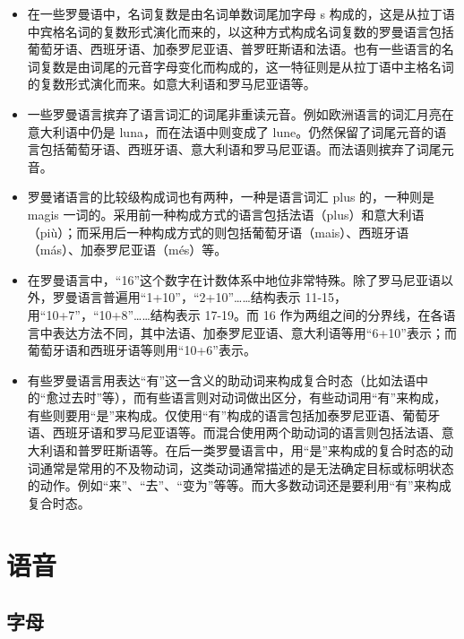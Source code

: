 \documentclass[UTF8,a4paper,titlepage,10pt]{report}
\begin{document}
\begin{enumerate}
\begin{itemize}
\item 在一些罗曼语中，名词复数是由名词单数词尾加字母 s 构成的，这是从拉丁语中宾格名词的复数形式演化而来的，以这种方式构成名词复数的罗曼语言包括葡萄牙语、西班牙语、加泰罗尼亚语、普罗旺斯语和法语。也有一些语言的名词复数是由词尾的元音字母变化而构成的，这一特征则是从拉丁语中主格名词的复数形式演化而来。如意大利语和罗马尼亚语等。
\item 一些罗曼语言摈弃了语言词汇的词尾非重读元音。例如欧洲语言的词汇月亮在意大利语中仍是 luna，而在法语中则变成了 lune。仍然保留了词尾元音的语言包括葡萄牙语、西班牙语、意大利语和罗马尼亚语。而法语则摈弃了词尾元音。
\item 罗曼诸语言的比较级构成词也有两种，一种是语言词汇 plus 的，一种则是 magis 一词的。采用前一种构成方式的语言包括法语（plus）和意大利语（più）；而采用后一种构成方式的则包括葡萄牙语（mais）、西班牙语（más）、加泰罗尼亚语（més）等。
\item 在罗曼语言中，“16”这个数字在计数体系中地位非常特殊。除了罗马尼亚语以外，罗曼语言普遍用“1+10”，“2+10”……结构表示 11-15，用“10+7”，“10+8”……结构表示 17-19。而 16 作为两组之间的分界线，在各语言中表达方法不同，其中法语、加泰罗尼亚语、意大利语等用“6+10”表示；而葡萄牙语和西班牙语等则用“10+6”表示。
\item 有些罗曼语言用表达“有”这一含义的助动词来构成复合时态（比如法语中的“愈过去时”等），而有些语言则对动词做出区分，有些动词用“有”来构成，有些则要用“是”来构成。仅使用“有”构成的语言包括加泰罗尼亚语、葡萄牙语、西班牙语和罗马尼亚语等。而混合使用两个助动词的语言则包括法语、意大利语和普罗旺斯语等。在后一类罗曼语言中，用“是”来构成的复合时态的动词通常是常用的不及物动词，这类动词通常描述的是无法确定目标或标明状态的动作。例如“来”、“去”、“变为”等等。而大多数动词还是要利用“有”来构成复合时态。
\end{itemize}
\end{enumerate}

\part{语音}
\label{sec:org3c8d13d}

\chapter{字母}
\label{sec:orgac2e3cc}
\end{document}
